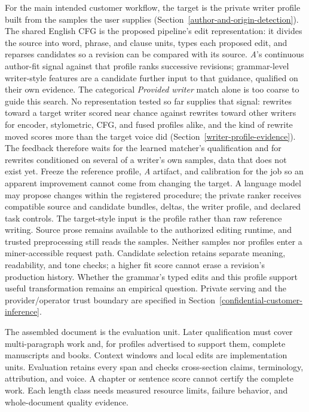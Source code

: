 For the main intended customer workflow, the target is the private writer
profile built from the samples the user supplies
(Section~\ref{author-and-origin-detection}).
The shared English CFG is the proposed pipeline's edit representation: it
divides the source into word, phrase, and clause units, types each proposed
edit, and reparses candidates so a revision can be compared with its source.
\textit{A}'s continuous author-fit signal against that profile ranks successive
revisions; grammar-level writer-style features are a candidate further input to
that guidance, qualified on their own evidence. The
categorical \emph{Provided writer} match alone is too coarse to guide this
search. No representation tested so far supplies that signal: rewrites toward a
target writer scored near chance against rewrites toward other writers for
encoder, stylometric, CFG, and fused profiles alike, and the kind of rewrite
moved scores more than the target voice did (Section~\ref{writer-profile-evidence}).
The feedback therefore waits for the learned matcher's qualification and for
rewrites conditioned on several of a writer's own samples, data that does not
exist yet. Freeze the reference profile, \textit{A} artifact, and calibration
for the job so an apparent improvement cannot come from changing the target.
A language model may propose changes within the registered procedure; the
private ranker receives compatible source and candidate bundles, deltas, the
writer profile, and declared task controls. The target-style input is the
profile rather than raw reference writing. Source prose remains available to the
authorized editing runtime, and trusted preprocessing still reads the samples.
Neither samples nor profiles enter a miner-accessible request path. Candidate
selection retains separate meaning, readability, and tone checks; a higher fit
score cannot erase a revision's production history.
Whether the grammar's typed edits and this profile support useful transformation
remains an empirical question. Private serving and the provider/operator trust boundary are specified
in Section~\ref{confidential-customer-inference}.

The assembled document is the evaluation unit. Later qualification must cover
multi-paragraph work and, for profiles advertised to support them, complete
manuscripts and books. Context windows and local edits are implementation
units. Evaluation retains every span and checks cross-section claims,
terminology, attribution, and voice. A chapter or sentence score cannot certify
the complete work. Each length class needs measured resource limits,
failure behavior, and whole-document quality evidence.

